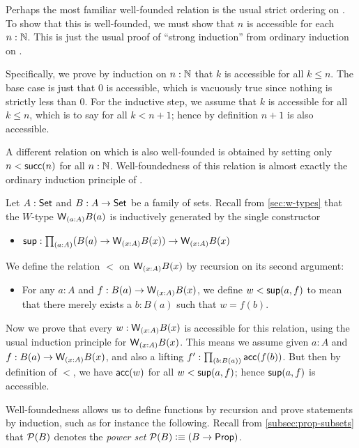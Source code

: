 \begin{eg}\label{thm:nat-wf}
  Perhaps the most familiar well-founded relation is the usual strict ordering on \nat.
  To show that this is well-founded, we must show that $n$ is accessible for each $n:\mathbb{N}$.
  This is just the usual proof of ``strong induction'' from ordinary induction on \nat.

  Specifically, we prove by induction on $n:\mathbb{N}$ that $k$ is accessible for all $k\le n$.
  The base case is just that $0$ is accessible, which is vacuously true since nothing is strictly less than $0$.
  For the inductive step, we assume that $k$ is accessible for all $k\le n$, which is to say for all $k<n+1$; hence by definition $n+1$ is also accessible.

  A different relation on \nat which is also well-founded is obtained by setting only $n < \mathsf{succ}(n)$ for all $n:\mathbb{N}$.
  Well-foundedness of this relation is almost exactly the ordinary induction principle of \nat.
\end{eg}

\begin{eg}\label{thm:wtype-wf}
  Let $A:\mathsf{Set}$ and $B : A \to \mathsf{Set}$ be a family of sets.
  Recall from \cref{sec:w-types} that the $W$-type $\wtype{a:A} B(a)$ is inductively generated by the single constructor
  \begin{itemize}
  \item $\supp : \prd{a:A} (B(a) \to \wtype{x:A} B(x)) \to \wtype{x:A} B(x)$
  \end{itemize}
  We define the relation $<$ on $\wtype{x:A} B(x)$ by recursion on its second argument:
  \begin{itemize}
  \item For any $a:A$ and $f:B(a) \to \wtype{x:A} B(x)$, we define $w<{\mathsf{sup}}(a,f)$ to mean that there merely exists a $b:B(a)$ such that $w = f(b)$.
  \end{itemize}
  Now we prove that every $w:\wtype{x:A} B(x)$ is accessible for this relation, using the usual induction principle for $\wtype{x:A}B(x)$.
  This means we assume given $a:A$ and $f:B(a) \to \wtype{x:A} B(x)$, and also a lifting $f' : \prd{b:B(a)} \acc(f(b))$.
  But then by definition of $<$, we have $\mathsf{acc}(w)$ for all $w<{\mathsf{sup}}(a,f)$; hence ${\mathsf{sup}}(a,f)$ is accessible.
\end{eg}

Well-foundedness allows us to define functions by recursion and prove statements by induction, such as for instance the following.
Recall from \cref{subsec:prop-subsets} that $\mathcal{P}(B)$ denotes the \emph{power set} $\mathcal{P}(B) \vcentcolon\equiv (B\to\mathsf{Prop})$.

